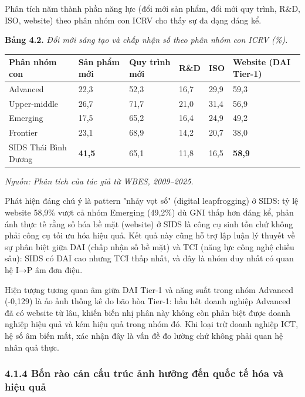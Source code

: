 \documentclass[12pt,a4paper]{article}
\begin{document}
Phân tích năm thành phần năng lực (đổi mới sản phẩm, đổi mới quy trình,
R\&D, ISO, website) theo phân nhóm con ICRV cho thấy sự đa dạng đáng kể.

\textbf{Bảng 4.2.} \emph{Đổi mới sáng tạo và chấp nhận số theo phân nhóm
con ICRV (\%).}

\begin{longtable}[]{@{}llllll@{}}
\toprule\noalign{}
Phân nhóm con & Sản phẩm mới & Quy trình mới & R\&D & ISO & Website (DAI
Tier-1) \\
\midrule\noalign{}
\endhead
\bottomrule\noalign{}
\endlastfoot
Advanced & 22,3 & 52,3 & 16,7 & 29,9 & 59,3 \\
Upper-middle & 26,7 & 71,7 & 21,0 & 31,4 & 56,9 \\
Emerging & 17,5 & 65,2 & 16,4 & 24,9 & 49,2 \\
Frontier & 23,1 & 68,9 & 14,2 & 20,7 & 38,0 \\
SIDS Thái Bình Dương & \textbf{41,5} & 65,1 & 11,8 & 16,5 &
\textbf{58,9} \\
\end{longtable}

\emph{Nguồn: Phân tích của tác giả từ WBES, 2009--2025.}

Phát hiện đáng chú ý là pattern "nhảy vọt số" (digital leapfrogging) ở
SIDS: tỷ lệ website 58,9\% vượt cả nhóm Emerging (49,2\%) dù GNI thấp
hơn đáng kể, phản ánh thực tế rằng số hóa bề mặt (website) ở SIDS là
công cụ sinh tồn chứ không phải công cụ tối ưu hóa hiệu quả. Kết quả này
cũng hỗ trợ lập luận lý thuyết về sự phân biệt giữa DAI (chấp nhận số bề
mặt) và TCI (năng lực công nghệ chiều sâu): SIDS có DAI cao nhưng TCI
thấp nhất, và đây là nhóm duy nhất có quan hệ I→P âm đơn điệu.

Hiện tượng tương quan âm giữa DAI Tier-1 và năng suất trong nhóm
Advanced (-0,129) là ảo ảnh thống kê do bão hòa Tier-1: hầu hết doanh
nghiệp Advanced đã có website từ lâu, khiến biến nhị phân này không còn
phân biệt được doanh nghiệp hiệu quả và kém hiệu quả trong nhóm đó. Khi
loại trừ doanh nghiệp ICT, hệ số âm biến mất, xác nhận đây là vấn đề đo
lường chứ không phải quan hệ nhân quả thực.

\hypertarget{414-bux1ed1n-ruxe0o-cux1ea3n-cux1ea5u-truxfac-ux1ea3nh-hux1b0ux1edfng-ux111ux1ebfn-quux1ed1c-tux1ebf-huxf3a-vuxe0-hiux1ec7u-quux1ea3}{%
\subsubsection{4.1.4 Bốn rào cản cấu trúc ảnh hưởng đến quốc tế hóa và
hiệu
quả}\label{414-bux1ed1n-ruxe0o-cux1ea3n-cux1ea5u-truxfac-ux1ea3nh-hux1b0ux1edfng-ux111ux1ebfn-quux1ed1c-tux1ebf-huxf3a-vuxe0-hiux1ec7u-quux1ea3}}
\end{document}
